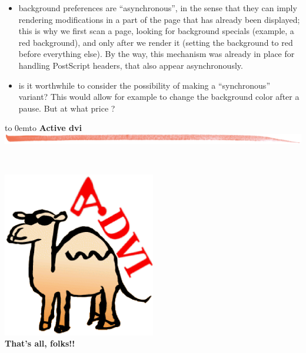 \documentclass[12pt]{article}
\def\keymenu#1{\textcolor{red}{\underline{#1}}}
\def\advifooter{\vbox to 0em{\vbox to \vsize {\vfill
Press: \keymenu{n}ext page \keymenu{p}revious page
\keymenu{\textvisiblespace} next pause%
\hfill{\adviembed[sticky=advianim,width=1.56cm,height=1.824cm]{animate -geometry !g! -window !p advilogo.anim.gif}}
} \vss}}
\def\adviheader{\noindent
{\bf\Large Active dvi}\\
\includegraphics[width=\textwidth]{../tex/bar.jpg.eps}}
\let \Newpage \newpage
\def \newpage {\Newpage \advifooter\adviheader}
\def\adviemptyfooter{\vbox to 0em{\vbox to \vsize {\vfill
~~\vss\advikillembed{advianim}}}}
\def\lastpage{\Newpage\adviemptyfooter\adviheader}
\begin{document}
  \begin{itemize}
    \item background preferences are ``asynchronous'', in the sense
that they can imply rendering modifications in a part of the page that
has already been displayed; this is why we first scan a page, looking
for background specials (example, a red background), and only after we
render it (setting the background to red before everything else). By
the way, this mechanism was already in place for handling PostScript
headers, that also appear asynchronously.
    \item is it worthwhile to consider the possibility of making a
``synchronous'' variant? This would allow for example to change the
background color after a pause. But at what price ?
  \end{itemize}

\lastpage

~\vfill
\begin{center}
\includegraphics[width=0.5\textwidth]{../tex/advilogo.eps}\\
{\Large \bf That's all, folks!!}
\end{center}
\vfill
\end{document}
